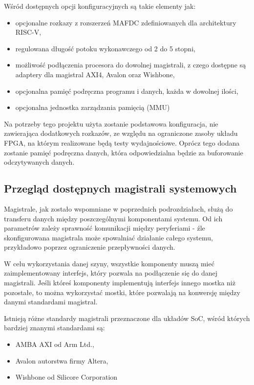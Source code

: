 Wśród dostępnych opcji konfiguracyjnych są takie elementy jak:
\begin{itemize}
	\item opcjonalne rozkazy z rozszerzeń MAFDC zdefiniowanych dla architektury RISC-V,
	\item regulowana długość potoku wykonawczego od 2 do 5 stopni,
	\item możliwość podłączenia procesora do dowolnej magistrali, z czego dostępne są adaptery dla magistral AXI4, Avalon oraz Wishbone,
	\item opcjonalna pamięć podręczna programu i danych, każda w dowolnej ilości,
	\item opcjonalna jednostka zarządzania pamięcią (MMU)
\end{itemize}

Na potrzeby tego projektu użyta zostanie podstawowa konfiguracja, nie zawierająca dodatkowych rozkazów, ze względu na ograniczone zasoby układu FPGA, na którym realizowane będą testy wydajnościowe. Oprócz tego dodana zostanie pamięć podręczna danych, która odpowiedzialna będzie za buforowanie odczytywanych danych.

\subsection{Przegląd dostępnych magistrali systemowych}

Magistrale, jak zostało wspomniane w poprzednich podrozdziałach, służą do transferu danych między poszczególnymi komponentami systemu. Od ich parametrów zależy sprawność komunikacji między peryferiami - źle skonfigurowana magistrala może spowalniać działanie całego systemu, przykładowo poprzez ograniczenie przepływności danych.

W celu wykorzystania danej szyny, wszystkie komponenty muszą mieć zaimplementowany interfejs, który pozwala na podłączenie się do danej magistrali. Jeśli któreś komponenty implementują interfejs innego mostka niż pozostałe, to można wykorzystać mostki, które pozwalają na konwersję między danymi standardami magistral.

Istnieją różne standardy magistrali przeznaczone dla układów SoC, wśród których bardziej znanymi standardami są:
\begin{itemize}
	\item AMBA AXI\cite{amba-axi:2021:Online} od Arm Ltd.,
	\item Avalon\cite{avalon:2005:Online} autorstwa firmy Altera,
	\item Wishbone\cite{wishbone:2019:Online} od Silicore Corporation
\end{itemize}

